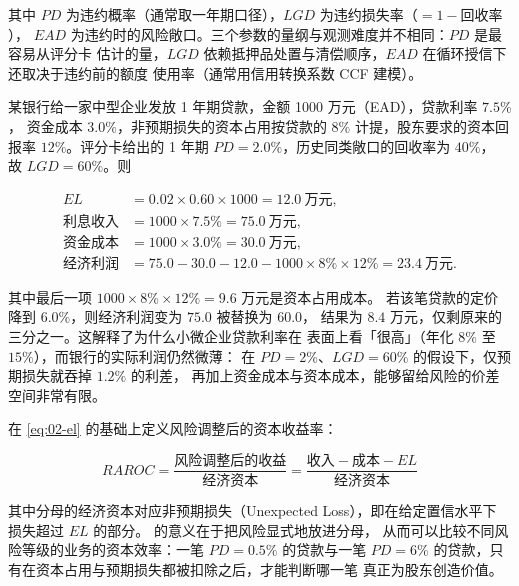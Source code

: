 其中 $PD$ 为违约概率（通常取一年期口径），$LGD$ 为违约损失率（$= 1 - \text{回收率}$），
$EAD$ 为违约时的风险敞口。三个参数的量纲与观测难度并不相同：$PD$ 是最容易从评分卡
估计的量，$LGD$ 依赖抵押品处置与清偿顺序，$EAD$ 在循环授信下还取决于违约前的额度
使用率（通常用信用转换系数 CCF 建模）。

\begin{example}[一笔贷款的预期损失与经济利润]\label{ex:02-el}
某银行给一家中型企业发放 1 年期贷款，金额 1000 万元（EAD），贷款利率 $7.5\%$，
资金成本 $3.0\%$，非预期损失的资本占用按贷款的 $8\%$ 计提，股东要求的资本回报率
$12\%$。评分卡给出的 1 年期 $PD = 2.0\%$，历史同类敞口的回收率为 $40\%$，
故 $LGD = 60\%$。则

\begin{align}
  EL &= 0.02 \times 0.60 \times 1000 = 12.0\ \text{万元}, \label{eq:02-el-calc} \\
  \text{利息收入} &= 1000 \times 7.5\% = 75.0\ \text{万元}, \nonumber \\
  \text{资金成本} &= 1000 \times 3.0\% = 30.0\ \text{万元}, \nonumber \\
  \text{经济利润} &= 75.0 - 30.0 - 12.0 - 1000 \times 8\% \times 12\%
                   = 23.4\ \text{万元}. \nonumber
\end{align}

其中最后一项 $1000 \times 8\% \times 12\% = 9.6$ 万元是资本占用成本。
若该笔贷款的定价降到 $6.0\%$，则经济利润变为 $75.0$ 被替换为 $60.0$，
结果为 $8.4$ 万元，仅剩原来的三分之一。这解释了为什么小微企业贷款利率在
表面上看「很高」（年化 $8\%$ 至 $15\%$），而银行的实际利润仍然微薄：
在 $PD = 2\%$、$LGD = 60\%$ 的假设下，仅预期损失就吞掉 $1.2\%$ 的利差，
再加上资金成本与资本成本，能够留给风险的价差空间非常有限。
\end{example}

在 \cref{eq:02-el} 的基础上定义风险调整后的资本收益率：

\begin{equation}\label{eq:02-raroc}
  RAROC = \frac{\text{风险调整后的收益}}{\text{经济资本}}
        = \frac{\text{收入} - \text{成本} - EL}{\text{经济资本}}
\end{equation}

其中分母的经济资本对应非预期损失（Unexpected Loss），即在给定置信水平下
损失超过 $EL$ 的部分。 的意义在于把风险显式地放进分母，
从而可以比较不同风险等级的业务的资本效率：一笔 $PD = 0.5\%$ 的贷款与一笔
$PD = 6\%$ 的贷款，只有在资本占用与预期损失都被扣除之后，才能判断哪一笔
真正为股东创造价值。

